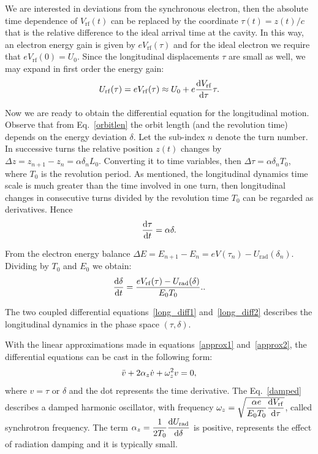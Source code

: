 We are interested in deviations from the synchronous electron, then the absolute time dependence of $V_{\mathrm{rf}}(t)$ can be replaced by the coordinate $\tau(t) = z(t)/c$ that is the relative difference to the ideal arrival time at the cavity. In this way, an electron energy gain is given by $eV_{\mathrm{rf}}(\tau)$ and for the ideal electron we require that $eV_{\mathrm{rf}}(0) = U_0$. Since the  longitudinal displacements $\tau$ are small as well, we may expand in first order the energy gain:
\begin{equation}
    U_{\mathrm{rf}}(\tau) = eV_{\mathrm{rf}}(\tau) \approx U_0 + e\dfrac{\mathrm{d} V_{\mathrm{rf}}}{\mathrm{d} \tau}\tau.
    \label{approx2}
\end{equation}

Now we are ready to obtain the differential equation for the longitudinal motion. Observe that from Eq.~\eqref{orbitlen} the orbit length (and the revolution time) depends on the energy deviation $\delta$. Let the sub-index $n$ denote the turn number. In successive turns the relative position $z(t)$ changes by $\Delta z = z_{n+1} - z_n = \alpha\delta_n L_0$. Converting it to time variables, then $\Delta \tau = \alpha \delta_n T_0$, where $T_0$ is the revolution period. As mentioned, the longitudinal dynamics time scale is much greater than the time involved in one turn, then longitudinal changes in consecutive turns divided by the revolution time $T_0$ can be regarded as derivatives. Hence
\begin{equation}
    \dfrac{\mathrm{d} \tau}{\mathrm{d} t} = \alpha \delta.
    \label{long_diff1}
\end{equation}

From the electron energy balance $\Delta E = E_{n+1} - E_n = eV(\tau_n) - U_{\mathrm{rad}}(\delta_n)$. Dividing by $T_0$ and $E_0$ we obtain:
\begin{equation}
    \dfrac{\mathrm{d} \delta}{\mathrm{d} t} = \dfrac{eV_{\mathrm{rf}}(\tau) - U_{\mathrm{rad}}(\delta)}{E_0 T_0}.
    \label{long_diff2}.
\end{equation}

The two coupled differential equations~\eqref{long_diff1} and~\eqref{long_diff2} describes the longitudinal dynamics in the phase space $(\tau, \delta)$.

With the linear approximations made in equations~\eqref{approx1} and~\eqref{approx2}, the differential equations can be cast in the following form:
\begin{equation}
    \Ddot{v} + 2\alpha_{z} \dot{v} + \omega_{z}^2 v = 0,
    \label{damped}
\end{equation}
where $v=\tau$ or $\delta$ and the dot represents the time derivative. The Eq.~\eqref{damped} describes a damped harmonic oscillator, with frequency $\omega_z = \sqrt{\dfrac{\alpha e}{E_0 T_0} \dfrac{\mathrm{d} V_{\mathrm{rf}}}{\mathrm{d} \tau}}$, called synchrotron frequency. The term $\alpha_z = \dfrac{1}{2T_0} \dfrac{\mathrm{d} U_{\mathrm{rad}}}{\mathrm{d} \delta}$ is positive, represents the effect of radiation damping and it is typically small. 

